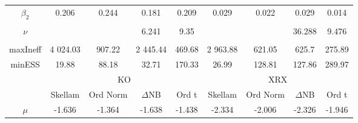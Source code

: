\begin{footnotesize}
\begin{singlespace}
\begin{tabular}{ccccccccc}
$ \beta_{2} $ & 0.206 & 0.244 & 0.181 & 0.209 & 0.029 & 0.022 & 0.029 & 0.014 \\ 
 & \begin{tiny} [0.084,0.327] \end{tiny}  & \begin{tiny} [0.14,0.348] \end{tiny}  & \begin{tiny} [0.059,0.302] \end{tiny}  & \begin{tiny} [0.02,0.397] \end{tiny}  & \begin{tiny} [-0.039,0.1] \end{tiny}  & \begin{tiny} [-0.013,0.057] \end{tiny}  & \begin{tiny} [-0.043,0.098] \end{tiny}  & \begin{tiny} [-0.051,0.079] \end{tiny}  \\ 
$\nu$ &  &  & 6.241 & 9.35 &  &  & 36.288 & 9.476 \\ 
 &  &  & \begin{tiny} [4.4,8] \end{tiny}  & \begin{tiny} [8,10.7] \end{tiny}  &  &  & \begin{tiny} [29.6,43.8] \end{tiny}  & \begin{tiny} [8.8,10.1] \end{tiny}  \\  \midrule 
maxIneff & 4 024.03 &  907.22 & 2 445.44 &  469.68 & 2 963.88 &  621.05 &  625.7 &  275.89 \\ 
minESS & 19.88 & 88.18 & 32.71 &  170.33 & 26.99 &  128.81 &  127.86 &  289.97 \\ \midrule 
 & \multicolumn{4}{c}{KO}& \multicolumn{4}{c}{XRX} \\ 
\cmidrule(r){2-5} \cmidrule(r){6-9} &  \multicolumn{1}{c}{Skellam}&  \multicolumn{1}{c}{Ord Norm}&  \multicolumn{1}{c}{$\Delta$NB}&  \multicolumn{1}{c}{Ord t}&  \multicolumn{1}{c}{Skellam}&  \multicolumn{1}{c}{Ord Norm}&  \multicolumn{1}{c}{$\Delta$NB}&  \multicolumn{1}{c}{Ord t} \\ \midrule 
 $ \mu $ & -1.636 & -1.364 & -1.638 & -1.438 & -2.334 & -2.006 & -2.326 & -1.946 \\ 

\end{tabular}
\end{singlespace}
\end{footnotesize}
